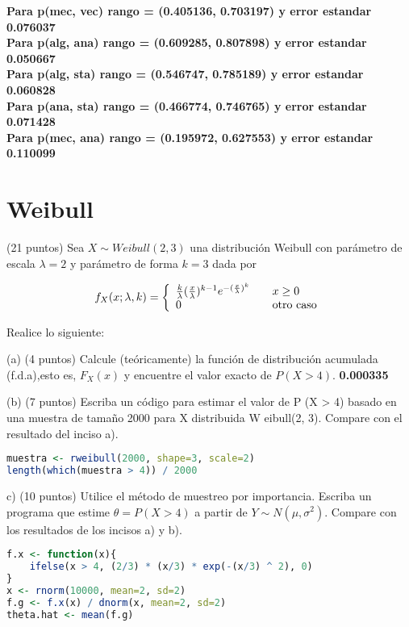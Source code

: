 \documentclass[11pt]{article}
\begin{document}
\noindent \textbf{ Para p(mec, vec) rango = (0.405136, 0.703197) y error estandar 0.076037 } \\
\noindent \textbf{ Para p(alg, ana) rango = (0.609285, 0.807898) y error estandar 0.050667 } \\
\noindent \textbf{ Para p(alg, sta) rango = (0.546747, 0.785189) y error estandar 0.060828 } \\
\noindent \textbf{ Para p(ana, sta) rango = (0.466774, 0.746765) y error estandar 0.071428 } \\
\noindent \textbf{ Para p(mec, ana) rango = (0.195972, 0.627553) y error estandar 0.110099 } \\

\section{Weibull}
\noindent (21 puntos) Sea $X\sim Weibull(2,3)$ una distribución Weibull con parámetro de escala $ \lambda = 2$ y parámetro de forma $k = 3$ dada por 

\[ f_X(x;\lambda,k) = \left\{
  \begin{array}{l l}
    \frac{k}{\lambda}(\frac{x}{\lambda})^{k-1} e^{-(\frac{x}{\lambda})^k} & \quad  x \geq 0\\
    0 & \quad \text{otro caso}
  \end{array} \right.\]


\noindent Realice lo siguiente:

\noindent (a) (4 puntos) Calcule (teóricamente) la función de distribución acumulada (f.d.a),esto es, $F_X (x)$ y encuentre el valor exacto de $P (X > 4)$.
\noindent \textbf { 0.000335 }

\noindent (b) (7 puntos) Escriba un código para estimar el valor de P (X > 4) basado en una muestra de tamaño 2000 para X distribuida W eibull(2, 3). Compare con el resultado del inciso a).

\begin{lstlisting}[language=R]
muestra <- rweibull(2000, shape=3, scale=2)
length(which(muestra > 4)) / 2000
\end{lstlisting}

\noindent c) (10 puntos) Utilice el método de muestreo por importancia. Escriba un programa que estime $ \theta = P (X > 4)$ a partir de $ Y \sim N(\mu, \sigma^2 ) $. Compare con los resultados de los incisos a) y b).

\begin{lstlisting}[language=R]
f.x <- function(x){
    ifelse(x > 4, (2/3) * (x/3) * exp(-(x/3) ^ 2), 0)
}
x <- rnorm(10000, mean=2, sd=2)
f.g <- f.x(x) / dnorm(x, mean=2, sd=2)
theta.hat <- mean(f.g)
\end{lstlisting}
\end{document}

